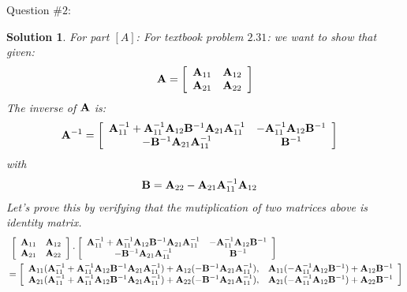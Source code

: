 \documentclass[11pt]{article}\usepackage[]{graphicx}\usepackage[]{color}
\newtheorem{sol}{Solution}
\begin{document}
Question $\# 2$:
\begin{sol}
	For part $[A]$:\vskip 2mm
	For textbook problem $2.31$:\vskip 2mm
	we want to show that given:
	\begin{align*}
		{\bf A} = \left[\begin{array}{cc} {\bf A}_{11}& {\bf A}_{12}\\{\bf A}_{21} & {\bf A}_{22}\end{array}\right]
	\end{align*}
	The inverse of ${\bf A}$ is:
	\begin{align*}
		{\bf A}^{-1} &= \left[\begin{array}{cc} {\bf A}_{11}^{-1} + {\bf A}_{11}^{-1}{\bf A}_{12}{\bf B}^{-1}{\bf A}_{21}{\bf A}_{11}^{-1}& -{\bf A}_{11}^{-1}{\bf A}_{12}{\bf B}^{-1}\\ -{\bf B}^{-1}{\bf A}_{21}{\bf A}_{11}^{-1}& {\bf B}^{-1}\end{array}\right]
	\end{align*}
	with 
	\begin{align*}
	{\bf B} &= {\bf A}_{22} - {\bf A}_{21}{\bf A}_{11}^{-1}{\bf A}_{12}
	\end{align*}
	Let's prove this by verifying that the mutiplication of two matrices above is identity matrix.
	\begin{align*}
		&\ \left[\begin{array}{cc} {\bf A}_{11}& {\bf A}_{12}\\{\bf A}_{21} & {\bf A}_{22}\end{array}\right]\cdot  \left[\begin{array}{cc} {\bf A}_{11}^{-1} + {\bf A}_{11}^{-1}{\bf A}_{12}{\bf B}^{-1}{\bf A}_{21}{\bf A}_{11}^{-1}& -{\bf A}_{11}^{-1}{\bf A}_{12}{\bf B}^{-1}\\ -{\bf B}^{-1}{\bf A}_{21}{\bf A}_{11}^{-1}& {\bf B}^{-1}\end{array}\right]\\
		& = \left[\begin{array}{cc}{\bf A}_{11}({\bf A}_{11}^{-1} + {\bf A}_{11}^{-1}{\bf A}_{12}{\bf B}^{-1}{\bf A}_{21}{\bf A}_{11}^{-1}) + {\bf A}_{12}(-{\bf B}^{-1}{\bf A}_{21}{\bf A}_{11}^{-1}), & {\bf A}_{11}(-{\bf A}_{11}^{-1}{\bf A}_{12}{\bf B}^{-1}) + {\bf A}_{12}{\bf B}^{-1}\\ {\bf A}_{21}({\bf A}_{11}^{-1} + {\bf A}_{11}^{-1}{\bf A}_{12}{\bf B}^{-1}{\bf A}_{21}{\bf A}_{11}^{-1}) + {\bf A}_{22}(-{\bf B}^{-1}{\bf A}_{21}{\bf A}_{11}^{-1}),& {\bf A}_{21}(-{\bf A}_{11}^{-1}{\bf A}_{12}{\bf B}^{-1}) + {\bf A}_{22}{\bf B}^{-1} \end{array}\right]

\end{align*}
\end{sol}
\end{document}
